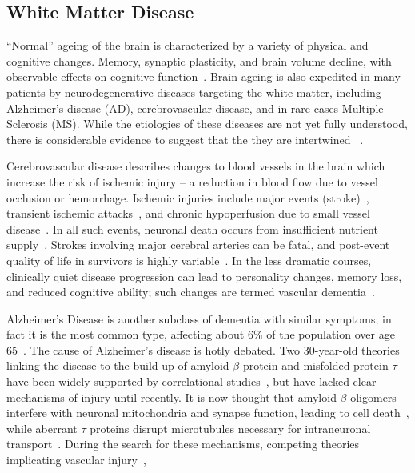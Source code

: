 \subsection{White Matter Disease}\label{ss:WMD}
``Normal'' ageing of the brain is characterized by a variety of physical and cognitive changes.
Memory, synaptic plasticity, and brain volume decline,
with observable effects on cognitive function~\cite{Peters2006,Good2002}.
Brain ageing is also expedited in many patients by neurodegenerative diseases
targeting the white matter, including
Alzheimer's disease (AD), cerebrovascular disease, and in rare cases Multiple Sclerosis (MS).
While the etiologies of these diseases are not yet fully understood,
there is considerable evidence to suggest that the they are intertwined%
~\cite{Debette2010,Conklin2014,Heppner2015,Snyder2015}.
\par
Cerebrovascular disease describes changes to blood vessels in the brain which increase the risk of
ischemic injury -- a reduction in blood flow due to vessel occlusion or hemorrhage.
Ischemic injuries include
major events (stroke)~\cite{VanderWorp2007},
transient ischemic attacks~\cite{Albers2002}, and
chronic hypoperfusion due to small vessel disease~\cite{Pantoni2010}.
In all such events, neuronal death occurs from insufficient nutrient supply~\cite{VanderWorp2007}.
Strokes involving major cerebral arteries can be fatal,
and post-event quality of life in survivors is highly variable~\cite{Prabhakaran2015}.
In the less dramatic courses, clinically quiet disease progression can lead to
personality changes, memory loss, and reduced cognitive ability;
such changes are termed vascular dementia~\cite{Roman1993}.
\par
Alzheimer's Disease is another subclass of dementia with similar symptoms;
in fact it is the most common type,
affecting about 6\% of the population over age 65~\cite{Burns2009}.
The cause of Alzheimer's disease is hotly debated.
Two 30-year-old theories linking the disease to
the build up of amyloid $\beta$ protein and misfolded protein $\tau$
have been widely supported by correlational studies~\cite{Masters1985,Hardy2002,Lee2011},
but have lacked clear mechanisms of injury until recently.
It is now thought that amyloid $\beta$ oligomers interfere with
neuronal mitochondria and synapse function, leading to cell death~\cite{Kim2013,Tu2014},
while aberrant $\tau$ proteins disrupt microtubules
necessary for intraneuronal transport~\cite{Lee2011}.
During the search for these mechanisms, competing theories implicating
vascular injury~\cite{Snyder2015},
